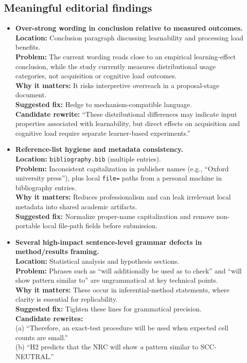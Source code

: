 \documentclass[11pt]{article}
\begin{document}
\subsection*{Meaningful editorial findings}

\begin{itemize}

\item \textbf{Over-strong wording in conclusion relative to measured outcomes.}\\
\textbf{Location:} Conclusion paragraph discussing learnability and processing load benefits.\\
\textbf{Problem:} The current wording reads close to an empirical learning-effect conclusion, while the study currently measures distributional usage categories, not acquisition or cognitive load outcomes.\\
\textbf{Why it matters:} It risks interpretive overreach in a proposal-stage document.\\
\textbf{Suggested fix:} Hedge to mechanism-compatible language.\\
\textbf{Candidate rewrite:} ``These distributional differences may indicate input properties associated with learnability, but direct effects on acquisition and cognitive load require separate learner-based experiments.''

\item \textbf{Reference-list hygiene and metadata consistency.}\\
\textbf{Location:} \texttt{bibliography.bib} (multiple entries).\\
\textbf{Problem:} Inconsistent capitalization in publisher names (e.g., ``Oxford university press''), plus local \texttt{file=} paths from a personal machine in bibliography entries.\\
\textbf{Why it matters:} Reduces professionalism and can leak irrelevant local metadata into shared academic artifacts.\\
\textbf{Suggested fix:} Normalize proper-name capitalization and remove non-portable local file-path fields before submission.

\item \textbf{Several high-impact sentence-level grammar defects in method/results framing.}\\
\textbf{Location:} Statistical analysis and hypothesis sections.\\
\textbf{Problem:} Phrases such as ``will additionally be used as to check'' and ``will show pattern similar to'' are ungrammatical at key technical points.\\
\textbf{Why it matters:} These occur in inferential-method statements, where clarity is essential for replicability.\\
\textbf{Suggested fix:} Tighten these lines for grammatical precision.\\
\textbf{Candidate rewrites:}\\
(a) ``Therefore, an exact-test procedure will be used when expected cell counts are small.''\\
(b) ``H2 predicts that the NRC will show \emph{a} pattern similar to SCC-NEUTRAL.''

\end{itemize}
\end{document}
